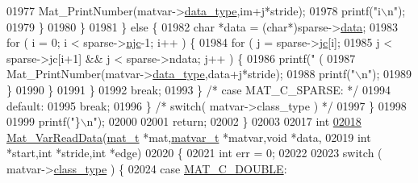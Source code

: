 \begin{DoxyCode}
{{{{{{{{{{{{{{{{{{{{{{{{{{{{{{{{{{{{{{{{{{01977                             Mat\_PrintNumber(matvar->\hyperlink{group___m_a_t_ab6aafe9bd77f0f077852593dec438144}{data\_type},im+j*stride);
01978                             printf(\textcolor{stringliteral}{"i\(\backslash\)n"});
01979                         \}
01980                     \}
01981                 \} \textcolor{keywordflow}{else} \{
01982                     \textcolor{keywordtype}{char} *data = (\textcolor{keywordtype}{char}*)sparse->\hyperlink{group___m_a_t_ae2c648cb9eac4ce47f26cddb44246152}{data};
01983                     for ( i = 0; i < sparse->\hyperlink{group___m_a_t_a482d8e4b40aa975f0c1daf146ebe08a4}{njc}-1; i++ ) \{
01984                         \textcolor{keywordflow}{for} ( j = sparse->\hyperlink{group___m_a_t_ad1e74cdc4f7eff1e47a670297c01da4b}{jc}[i];
01985                               j < sparse->jc[i+1] && j < sparse->ndata; j++ ) \{
01986                             printf(\textcolor{stringliteral}{"    (%
01987                             Mat\_PrintNumber(matvar->\hyperlink{group___m_a_t_ab6aafe9bd77f0f077852593dec438144}{data\_type},data+j*stride);
01988                             printf(\textcolor{stringliteral}{"\(\backslash\)n"});
01989                         \}
01990                     \}
01991                 \}
01992                 \textcolor{keywordflow}{break};
01993             \} \textcolor{comment}{/* case MAT\_C\_SPARSE: */}
01994             \textcolor{keywordflow}{default}:
01995                 \textcolor{keywordflow}{break};
01996         \} \textcolor{comment}{/* switch( matvar->class\_type ) */}
01997     \}
01998 
01999     printf(\textcolor{stringliteral}{"\}\(\backslash\)n"});
02000 
02001     \textcolor{keywordflow}{return};
02002 \}
02003 
02017 \textcolor{keywordtype}{int}
\hyperlink{group___m_a_t_ga1845000f4fc6252ec5ff11c4b9f0759f}{02018} \hyperlink{group___m_a_t_ga1845000f4fc6252ec5ff11c4b9f0759f}{Mat\_VarReadData}(\hyperlink{struct__mat__t}{mat\_t} *mat,\hyperlink{group___m_a_t_structmatvar__t}{matvar\_t} *matvar,\textcolor{keywordtype}{void} *data,
02019       \textcolor{keywordtype}{int} *start,\textcolor{keywordtype}{int} *stride,\textcolor{keywordtype}{int} *edge)
02020 \{
02021     \textcolor{keywordtype}{int} err = 0;
02022 
02023     \textcolor{keywordflow}{switch} ( matvar->\hyperlink{group___m_a_t_aff13035bf3265dd7d9425e5d40c839d4}{class\_type} ) \{
02024         \textcolor{keywordflow}{case} \hyperlink{group___m_a_t_ggad4d60ae7b709fc81bfd744fb4c857c40a5d70e0862e5bdb7bd86bf7ba5948f307}{MAT\_C\_DOUBLE}:
}}}}}}}}}}}}}}}}}}}}}}}}}}}}}}}}}}}}}}}}}}}
\end{DoxyCode}
